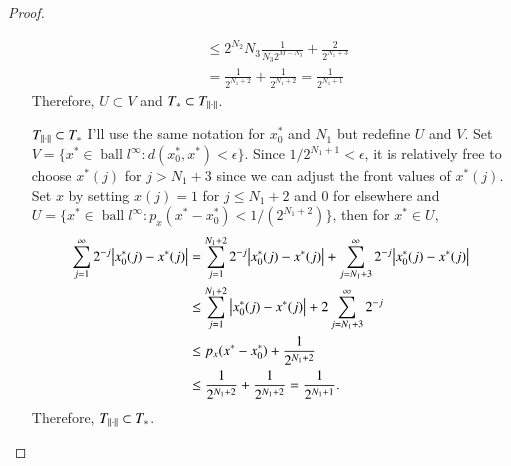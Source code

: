 \documentclass[a4paper, 12pt]{article}
\theoremstyle{Mydefinition}
\theoremstyle{Mytheorem}
\DeclareMathOperator{\ball}{ball}
\begin{document}
\begin{proof}
\begin{enumerate}
\begin{equation}
\begin{split}
        &\leq 2^{N_2}N_3 \frac{1}{N_3 2^{M-N_3}} + \frac{2}{2^{N_1+3}}\\
        &= \frac{1}{2^{N_1 + 2}}+\frac{1}{2^{N_1+2}} = \frac{1}{2^{N_1+1}}
    \end{split}
    \end{equation}
    Therefore, $U\subset V$ and $T_*\subset T_{\norm{\cdot}}$.
    \item[$T_{\norm{\cdot}}\subset T_*$] I'll use the same notation for $x_0^*$ and $N_1$ but redefine $U$ and $V$. Set $V=\{x^*\in \ball l^\infty:d(x_0^*, x^*)<\epsilon\}$. Since $1/2^{N_1+1}<\epsilon$, it is relatively free to choose $x^*(j)$ for $j>N_1+3$ since we can adjust the front values of $x^*(j)$. Set $x$ by setting $x(j)=1$ for $j\leq N_1+2$ and $0$ for elsewhere and $U= \{x^*\in \ball l^\infty:p_x(x^*-x_0^*)<1/(2^{N_1+2})\}$, then for $x^*\in U$,
    \begin{equation}
    \begin{split}
        \sum_{j=1}^\infty 2^{-j}\abs{x_0^*(j)-x^*(j)} &= \sum_{j=1}^{N_1+2} 2^{-j}\abs{x_0^*(j)-x^*(j)} + \sum_{j=N_1+3}^\infty 2^{-j}\abs{x_0^*(j)-x^*(j)} \\
        &\leq \sum_{j=1}^{N_1+2} \abs{x_0^*(j)-x^*(j)} + 2\sum_{j=N_1+3}^\infty 2^{-j}\\
        &\leq p_x(x^*-x_0^*) + \frac{1}{2^{N_1+2}}\\
        &\leq \frac{1}{2^{N_1+2}} + \frac{1}{2^{N_1+2}} = \frac{1}{2^{N_1+1}}.
    \end{split}
    \end{equation}
    Therefore, $T_{\norm{\cdot}}\subset T_*$.
\end{enumerate}
\end{proof}
\end{document}
